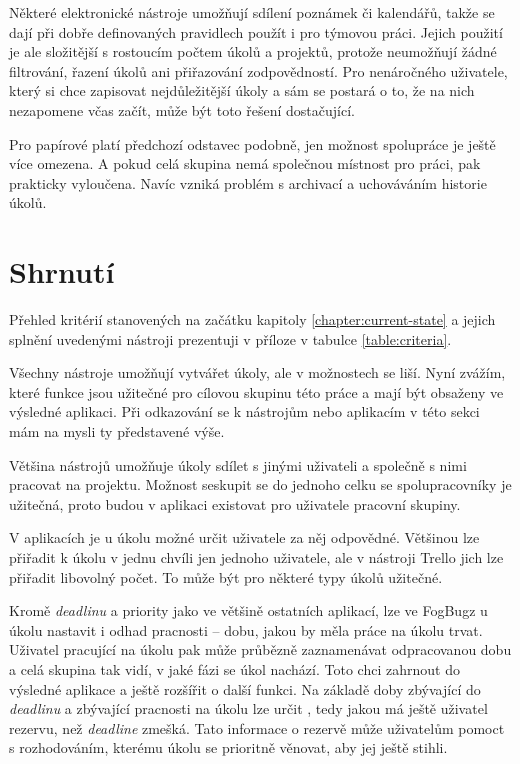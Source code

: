 \documentclass[thesis=B,czech]{FITthesis}[2012/06/26]
\begin{document}
			Některé elektronické nástroje umožňují sdílení poznámek či kalendářů, takže se dají při dobře definovaných pravidlech použít i pro týmovou práci. Jejich použití je ale složitější s rostoucím počtem úkolů a projektů, protože neumožňují žádné filtrování, řazení úkolů ani přiřazování zodpovědností. Pro nenáročného uživatele, který si chce zapisovat nejdůležitější úkoly a sám se postará o to, že na nich nezapomene včas začít, může být toto řešení dostačující.
			
			Pro papírové  platí předchozí odstavec podobně, jen možnost spolupráce je ještě více omezena. A pokud celá skupina nemá společnou místnost pro práci, pak prakticky vyloučena. Navíc vzniká problém s archivací a uchováváním historie úkolů.
		
	
	\section{Shrnutí}
		Přehled kritérií stanovených na začátku kapitoly \ref{chapter:current-state} a jejich splnění uvedenými nástroji prezentuji v příloze v tabulce \ref{table:criteria}.
		
		Všechny nástroje umožňují vytvářet úkoly, ale v možnostech se liší. Nyní zvážím, které funkce jsou užitečné pro cílovou skupinu této práce a mají být obsaženy ve výsledné aplikaci. Při odkazování se k nástrojům nebo aplikacím v této sekci mám na mysli ty představené výše.
		
		Většina nástrojů umožňuje úkoly sdílet s jinými uživateli a společně s nimi pracovat na projektu. Možnost seskupit se do jednoho celku se spolupracovníky je užitečná, proto budou v aplikaci existovat pro uživatele pracovní skupiny.
		
		V aplikacích je u úkolu možné určit uživatele za něj odpovědné. Většinou lze přiřadit k úkolu v jednu chvíli jen jednoho uživatele, ale v nástroji Trello jich lze přiřadit libovolný počet. To může být pro některé typy úkolů užitečné. 
		
		Kromě \textit{deadlinu} a priority jako ve většině ostatních aplikací, lze ve FogBugz u úkolu nastavit i odhad pracnosti -- dobu, jakou by měla práce na úkolu trvat. Uživatel pracující na úkolu pak může průbězně zaznamenávat odpracovanou dobu a celá skupina tak vidí, v jaké fázi se úkol nachází. Toto chci zahrnout do výsledné aplikace a ještě rozšířit o další funkci. Na základě doby zbývající do \textit{deadlinu} a zbývající pracnosti na úkolu lze určit , tedy jakou má ještě uživatel rezervu, než \textit{deadline} zmešká. Tato informace o rezervě může uživatelům pomoct s rozhodováním, kterému úkolu se prioritně věnovat, aby jej ještě stihli.
		
\end{document}

